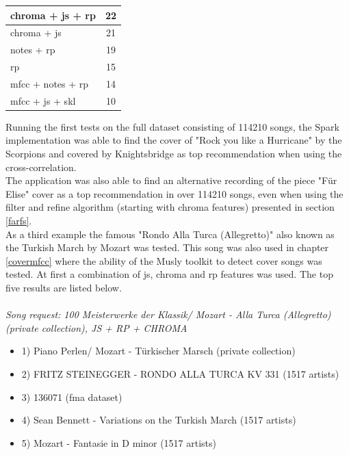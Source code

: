 \begin{table}[H]
\begin{minipage}{0.5\textwidth}
\begin{center}
\begin{tabular}{|l||c|}
				\hline
				chroma + js + rp & 22\\
				\hline
				chroma + js & 21\\
				\hline
				notes + rp & 19\\
				\hline
				rp & 15\\
				\hline
				mfcc + notes + rp & 14\\
				\hline
				mfcc + js + skl & 10\\
				\hline
			\end{tabular}
		\end{center}
	\end{minipage}
\end{table}

\noindent Running the first tests on the full dataset consisting of 114210 songs, the Spark implementation was able to find the cover of "Rock you like a Hurricane" by the Scorpions and covered by Knightsbridge as top recommendation when using the cross-correlation.\\
\noindent The application was also able to find an alternative recording of the piece "Für Elise" cover as a top recommendation in over 114210 songs, even when using the filter and refine algorithm (starting with chroma features) presented in section \ref{farfs}.\\
\noindent As a third example the famous "Rondo Alla Turca (Allegretto)" also known as the Turkish March by Mozart was tested. This song was also used in chapter \ref{covermfcc} where the ability of the Musly toolkit to detect cover songs was tested. 
At first a combination of js, chroma and rp features was used. The top five results are listed below.\\
\ \\
\textit{\noindent Song request: 100 Meisterwerke der Klassik/ Mozart - Alla Turca (Allegretto) (private collection), JS + RP + CHROMA}

\begin{itemize}
	\setlength\itemsep{-0.5em}
	\item 1) Piano Perlen/ Mozart - Türkischer Marsch (private collection)
	\item 2) FRITZ STEINEGGER - RONDO ALLA TURCA KV 331 (1517 artists)
	\item 3) 136071 (fma dataset)
	\item 4) Sean Bennett - Variations on the Turkish March (1517 artists)
	\item 5) Mozart - Fantasie in D minor (1517 artists)
\end{itemize}

